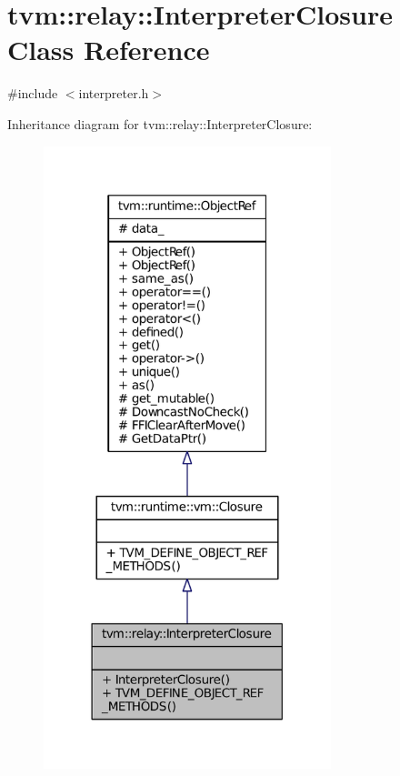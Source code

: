 \hypertarget{classtvm_1_1relay_1_1InterpreterClosure}{}\section{tvm\+:\+:relay\+:\+:Interpreter\+Closure Class Reference}
\label{classtvm_1_1relay_1_1InterpreterClosure}


{\ttfamily \#include $<$interpreter.\+h$>$}



Inheritance diagram for tvm\+:\+:relay\+:\+:Interpreter\+Closure\+:
\nopagebreak
\begin{figure}[H]
\begin{center}
\leavevmode
\includegraphics[width=237pt]{classtvm_1_1relay_1_1InterpreterClosure__inherit__graph}
\end{center}
\end{figure}


